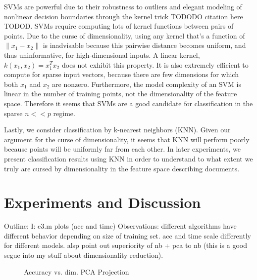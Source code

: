 \documentclass[]{article}
\begin{document}
SVMs are powerful due to their robustness to outliers and elegant modeling of nonlinear decision boundaries through the kernel trick TODODO citation here TODOD. SVMs require computing lots of kernel functions between pairs of points. Due to the curse of dimensionality, using any kernel that's a function of $\lVert x_1 - x_2 \rVert$ is inadvisable because this pairwise distance becomes uniform, and thus uninformative, for high-dimensional inputs. A linear kernel, $k(x_1,x_2) = x_1^Tx_2$ does not exhibit this property. It is also extremely efficient to compute for sparse input vectors, because there are few dimensions for which both $x_1$ and $x_2$ are nonzero. Furthermore, the model complexity of an SVM is linear in the number of training points, not the dimensionality of the feature space. Therefore it seems that SVMs are a good candidate for classification in the sparse $n << p$ regime. 

Lastly, we consider classification by k-nearest neighbors (KNN). Given our argument for the curse of dimensionality, it seems that KNN will perform poorly because points will be uniformly far from each other. In later experiments, we present classification results using KNN in order to understand to what extent we truly are cursed by dimensionality in the feature space describing documents. 


\section{Experiments and Discussion}
Outline: 
I: c3.m plots (acc and time)
Observations: different algorithms have different behavior depending on size of training set. acc and time scale differently for different models.
alsp point out superiority of nb + pca to nb (this is a good segue into my stuff about dimensionality reduction).



\begin{figure}[h!]
\centering
{}
\caption{Accuracy vs. dim. PCA Projection}
\label{fig:pca_acc_vs_proj_dim}
\end{figure}
\end{document}
